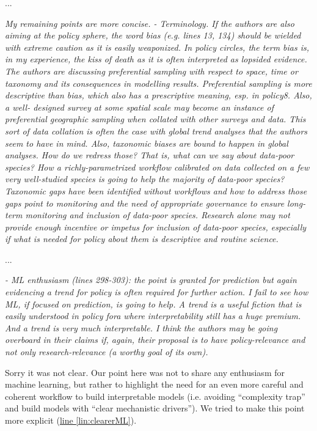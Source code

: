 \documentclass[11pt,letter]{article}
\begin{document}
...

\begin{mybox}
\emph{My remaining points are more concise.
- Terminology. If the authors are also aiming at the policy sphere, the word bias (e.g. lines
13, 134) should be wielded with extreme caution as it is easily weaponized. In policy
circles, the term bias is, in my experience, the kiss of death as it is often interpreted as
lopsided evidence. The authors are discussing preferential sampling with respect to space,
time or taxonomy and its consequences in modelling results. Preferential sampling is more
descriptive than bias, which also has a prescriptive meaning, esp. in policy8. Also, a well-
designed survey at some spatial scale may become an instance of preferential geographic
sampling when collated with other surveys and data. This sort of data collation is often the
case with global trend analyses that the authors seem to have in mind. Also, taxonomic
biases are bound to happen in global analyses. How do we redress those? That is, what can
we say about data-poor species? How a richly-parametrized workflow calibrated on data
collected on a few very well-studied species is going to help the majority of data-poor
species? Taxonomic gaps have been identified without workflows and how to address
those gaps point to monitoring and the need of appropriate governance to ensure long-
term monitoring and inclusion of data-poor species. Research alone may not provide
enough incentive or impetus for inclusion of data-poor species, especially if what is
needed for policy about them is descriptive and routine science.}  
\end{mybox}

...

\begin{mybox}
\emph{- ML enthusiasm (lines 298-303): the point is granted for prediction but again evidencing a
trend for policy is often required for further action. I fail to see how ML, if focused on
prediction, is going to help. A trend is a useful fiction that is easily understood in policy
fora where interpretability still has a huge premium. And a trend is very much
interpretable. I think the authors may be going overboard in their claims if, again, their
proposal is to have policy-relevance and not only research-relevance (a worthy goal of its
own).}  
\end{mybox}

Sorry it was not clear. Our point here was not to share any enthusiasm for machine learning, but rather to highlight the need for an even more careful and coherent workflow to build interpretable models (i.e. avoiding  ``complexity trap'' and build models with ``clear mechanistic drivers''). We tried to make this point more explicit  (\href{file:forecastflows_r2\#lintarget:clearerML}{line \ref*{lin:clearerML}}).
\end{document}
